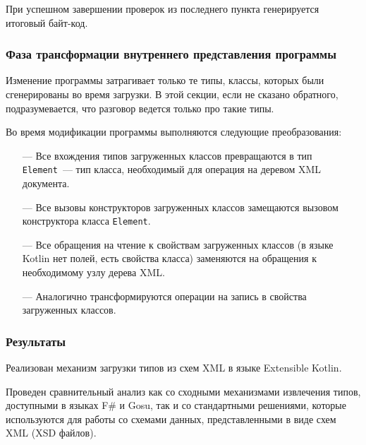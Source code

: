 При успешном завершении проверок из последнего пункта генерируется итоговый байт-код.
  
\subsubsection{Фаза трансформации внутреннего представления программы}\label{xml-tranformation-phase}
Изменение программы затрагивает только те типы, классы, которых были сгенерированы во время загрузки. В этой секции, если не сказано обратного, подразумевается, что разговор ведется только про такие типы.

Во время модификации программы выполняются следующие преобразования:
\begin{itemize}
\item[---] Все вхождения типов загруженных классов превращаются в тип \texttt{Element}~--- тип класса, необходимый для операция на деревом XML документа.
\item[---] Все вызовы конструкторов загруженных классов замещаются вызовом конструктора класса \texttt{Element}.
\item[---] Все обращения на чтение к свойствам загруженных классов (в языке Kotlin нет полей, есть свойства класса) заменяются на обращения к необходимому узлу дерева XML.
\item[---] Аналогично трансформируются операции на запись в свойства загруженных классов.
\end{itemize}

\subsubsection{Результаты}
Реализован механизм загрузки типов из схем XML в языке Extensible Kotlin.

Проведен сравнительный анализ как со сходными механизмами извлечения типов, доступными в языках F\# и Gosu, так и со стандартными решениями, которые используются для работы со схемами данных, представленными в виде схем XML (XSD файлов).